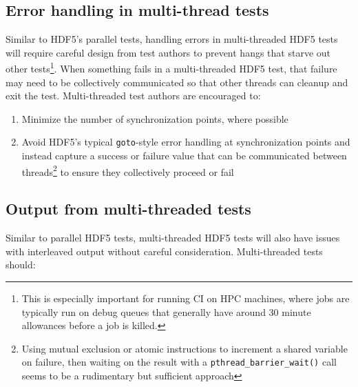 \documentclass[../HDF5_RFC.tex]{subfiles}
\begin{document}
\subsection{Error handling in multi-thread tests}

Similar to HDF5's parallel tests, handling errors in multi-threaded HDF5 tests will require careful design
from test authors to prevent hangs that starve out other tests\footnote{This is especially important for running CI on HPC machines, where jobs are typically run on debug queues that generally have around 30
minute allowances before a job is killed.}. When something fails in a multi-threaded HDF5 test, that
failure may need to be collectively communicated so that other threads can cleanup and exit the test.
Multi-threaded test authors are encouraged to:

\begin{enumerate}

    \item Minimize the number of synchronization points, where possible
    \item Avoid HDF5's typical \texttt{goto}-style error handling at synchronization points and instead
          capture a success or failure value that can be communicated between threads\footnote{Using
          mutual exclusion or atomic instructions to increment a shared variable on failure, then waiting
          on the result with a \texttt{pthread\_barrier\_wait()} call seems to be a rudimentary but
          sufficient approach} to ensure they collectively proceed or fail

\end{enumerate}

\subsection{Output from multi-threaded tests}

Similar to parallel HDF5 tests, multi-threaded HDF5 tests will also have issues with interleaved output
without careful consideration. Multi-threaded tests should:
\end{document}
